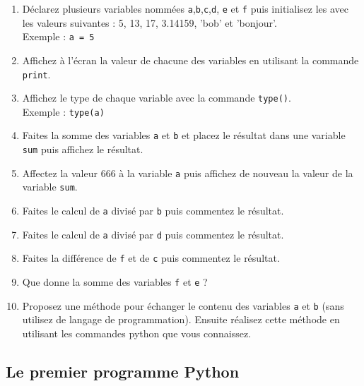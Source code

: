 \begin{enumerate}

\item        Déclarez        plusieurs        variables        nommées
  \texttt{a},\texttt{b},\texttt{c},\texttt{d},      \texttt{e}      et
  \texttt{f} puis initialisez les avec  les valeurs suivantes : 5, 13,
  17, 3.14159, 'bob' et 'bonjour'.\\ Exemple : \texttt{a = 5}

  
\item  Affichez  à l'écran  la  valeur  de  chacune des  variables  en
  utilisant la commande \texttt{print}.

\item  Affichez   le  type  de   chaque  variable  avec   la  commande
  \texttt{type()}.\\ Exemple : \texttt{type(a)}

\item Faites la somme des variables \texttt{a} et \texttt{b} et placez
  le  résultat  dans  une   variable  \texttt{sum}  puis  affichez  le
  résultat.

\item Affectez la valeur 666 à la variable \texttt{a} puis affichez de
  nouveau la valeur de la variable \texttt{sum}.

\item  Faites  le calcul  de  \texttt{a}  divisé par  \texttt{b}  puis
  commentez le résultat.

\item  Faites  le calcul  de  \texttt{a}  divisé par  \texttt{d}  puis
  commentez le résultat.

\item  Faites  la  différence  de \texttt{f}  et  de  \texttt{c}  puis
  commentez le résultat.

\item Que donne la somme des variables \texttt{f} et \texttt{e} ?

\item  Proposez une  méthode pour  échanger le  contenu des  variables
  \texttt{a}   et   \texttt{b}   (sans    utilisez   de   langage   de
  programmation).   Ensuite réalisez  cette méthode  en utilisant  les
  commandes python que vous connaissez.

\end{enumerate}


\subsection{Le premier programme Python}

